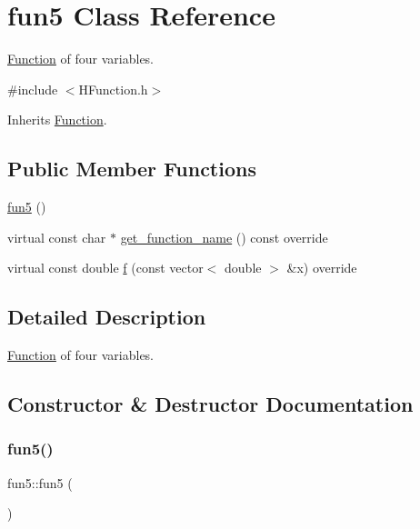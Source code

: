 \hypertarget{classfun5}{}\section{fun5 Class Reference}
\label{classfun5}


\hyperlink{class_function}{Function} of four variables.  




{\ttfamily \#include $<$H\+Function.\+h$>$}



Inherits \hyperlink{class_function}{Function}.

\subsection*{Public Member Functions}
\begin{DoxyCompactItemize}
\item 
\hyperlink{classfun5_af093fbe516b74b6042b238a469da71d9}{fun5} ()
\item 
virtual const char $\ast$ \hyperlink{classfun5_af90356003e95287857dd39404ba3f232}{get\+\_\+function\+\_\+name} () const override
\item 
virtual const double \hyperlink{classfun5_a8b68e41838f1055f14f1f5bd317fc84d}{f} (const vector$<$ double $>$ \&x) override
\end{DoxyCompactItemize}


\subsection{Detailed Description}
\hyperlink{class_function}{Function} of four variables. 

\subsection{Constructor \& Destructor Documentation}
\mbox{\label{classfun5_af093fbe516b74b6042b238a469da71d9}} 
\subsubsection{\texorpdfstring{fun5()}{fun5()}}
{\footnotesize\ttfamily fun5\+::fun5 (\begin{DoxyParamCaption}{ }\end{DoxyParamCaption})}



